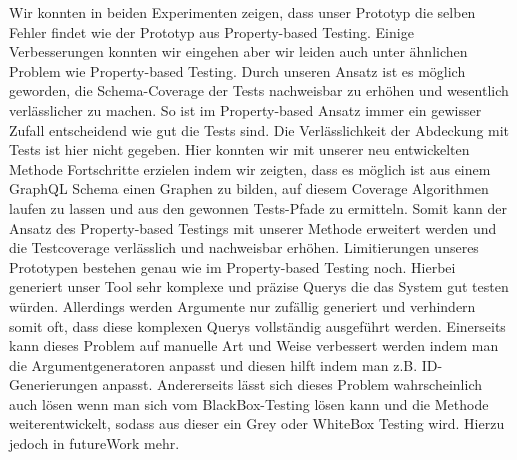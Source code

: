 Wir konnten in beiden Experimenten zeigen, dass unser Prototyp die selben Fehler findet wie der Prototyp aus Property-based Testing.
Einige Verbesserungen konnten wir eingehen aber wir leiden auch unter ähnlichen Problem wie Property-based Testing.
Durch unseren Ansatz ist es möglich geworden, die Schema-Coverage der Tests nachweisbar zu erhöhen und wesentlich verlässlicher zu machen.
So ist im Property-based Ansatz immer ein gewisser Zufall entscheidend wie gut die Tests sind.
Die Verlässlichkeit der Abdeckung mit Tests ist hier nicht gegeben.
Hier konnten wir mit unserer neu entwickelten Methode Fortschritte erzielen indem wir zeigten, dass es möglich ist aus einem GraphQL Schema
einen Graphen zu bilden, auf diesem Coverage Algorithmen laufen zu lassen und aus den gewonnen Tests-Pfade zu ermitteln.
Somit kann der Ansatz des Property-based Testings mit unserer Methode erweitert werden und die Testcoverage verlässlich und nachweisbar erhöhen.
Limitierungen unseres Prototypen bestehen genau wie im Property-based Testing noch.
Hierbei generiert unser Tool sehr komplexe und präzise Querys die das System gut testen würden.
Allerdings werden Argumente nur zufällig generiert und verhindern somit oft, dass diese komplexen Querys vollständig ausgeführt werden.
Einerseits kann dieses Problem auf manuelle Art und Weise verbessert werden indem man die Argumentgeneratoren anpasst und diesen hilft indem
man z.B. ID-Generierungen anpasst.
Andererseits lässt sich dieses Problem wahrscheinlich auch lösen wenn man sich vom BlackBox-Testing lösen kann und die Methode weiterentwickelt, sodass
aus dieser ein Grey oder WhiteBox Testing wird.
Hierzu jedoch in futureWork mehr.











